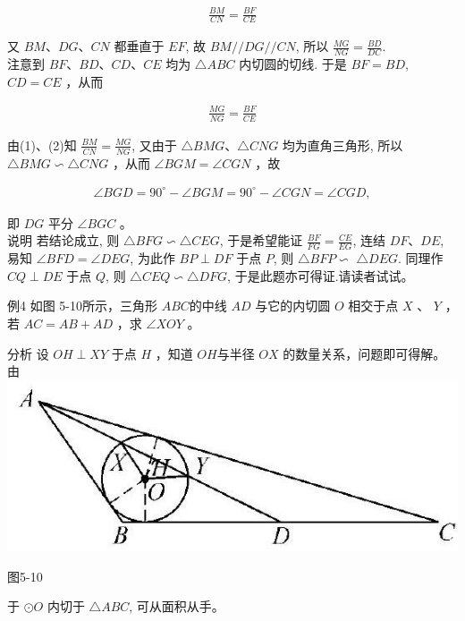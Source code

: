 \documentclass[10pt]{article}
\begin{document}
\begin{align*}
\frac{B M}{C N}=\frac{B F}{C E} \tag{1}
\end{align*}

又 $B M 、 D G 、 C N$ 都垂直于 $E F$, 故 $B M / / D G / / C N$, 所以 $\frac{M G}{N G}=\frac{B D}{D C}$.\\
注意到 $B F 、 B D 、 C D 、 C E$ 均为 $\triangle A B C$ 内切圆的切线. 于是 $B F=B D$, $C D=C E$ ，从而

\begin{align*}
\frac{M G}{N G}=\frac{B F}{C E} \tag{2}
\end{align*}

由(1)、(2)知 $\frac{B M}{C N}=\frac{M G}{N G}$, 又由于 $\triangle B M G 、 \triangle C N G$ 均为直角三角形, 所以 $\triangle B M G \backsim \triangle C N G$ ，从而 $\angle B G M=\angle C G N$ ，故

\begin{align*}
\angle B G D=90^{\circ}-\angle B G M=90^{\circ}-\angle C G N=\angle C G D,
\end{align*}

即 $D G$ 平分 $\angle B G C$ 。\\
说明 若结论成立, 则 $\triangle B F G \backsim \triangle C E G$, 于是希望能证 $\frac{B F}{F G}=\frac{C E}{E G}$, 连结 $D F 、 D E$, 易知 $\angle B F D=\angle D E G$, 为此作 $B P \perp D F$ 于点 $P$, 则 $\triangle B F P \backsim$ $\triangle D E G$. 同理作 $C Q \perp D E$ 于点 $Q$, 则 $\triangle C E Q \backsim \triangle D F G$, 于是此题亦可得证.请读者试试。

例4 如图 5-10所示，三角形 $A B C$的中线 $A D$ 与它的内切圆 $O$ 相交于点 $X$ 、 $Y$ ，若 $A C=A B+A D$ ，求 $\angle X O Y$ 。

分析 设 $O H \perp X Y$ 于点 $H$ ，知道 $O H$与半径 $O X$ 的数量关系，问题即可得解。由\\
\includegraphics[max width=\textwidth, center]{2024_10_30_66b8e5e701da2093c133g-037}

图5-10

于 $\odot O$ 内切于 $\triangle A B C$, 可从面积从手。
\end{document}
